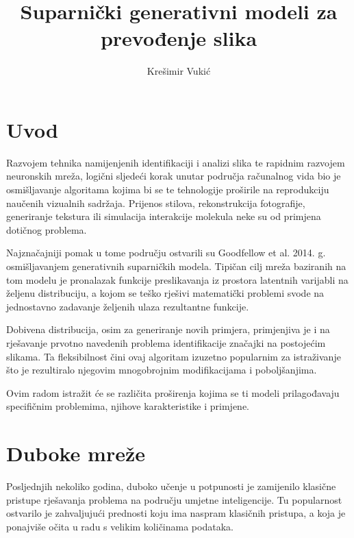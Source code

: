 \documentclass[lmodern, utf8, seminar]{fer}
\begin{document}
\nocite{*}



\title{Suparnički generativni modeli za prevođenje slika}

\author{Krešimir Vukić}

\maketitle


\tableofcontents




\chapter{Uvod}
Razvojem tehnika namijenjenih identifikaciji i analizi slika te rapidnim razvojem neuronskih mreža, logični sljedeći korak unutar područja računalnog vida bio je osmišljavanje algoritama kojima bi se te tehnologije proširile na reprodukciju naučenih vizualnih sadržaja. 
Prijenos stilova, rekonstrukcija fotografije, generiranje tekstura ili simulacija interakcije molekula neke su od primjena dotičnog problema.
\newline

Najznačajniji pomak u tome području ostvarili su Goodfellow et al. 2014. g. \cite{goodfellow2014generative} osmišljavanjem generativnih suparničkih modela. Tipičan cilj mreža baziranih na tom modelu je pronalazak funkcije preslikavanja iz prostora latentnih varijabli na željenu distribuciju, a kojom se teško rješivi matematički problemi svode na jednostavno zadavanje željenih ulaza rezultantne funkcije.
\newline

Dobivena distribucija, osim za generiranje novih primjera, primjenjiva je i na rješavanje prvotno navedenih problema identifikacije značajki na postojećim slikama. Ta fleksibilnost čini ovaj algoritam izuzetno popularnim za istraživanje što je rezultiralo njegovim mnogobrojnim modifikacijama i poboljšanjima.
\newline

Ovim radom istražit će se različita proširenja kojima se ti modeli prilagođavaju specifičnim problemima, njihove karakteristike i primjene.




\chapter{Duboke mreže}
Posljednjih nekoliko godina, duboko učenje u potpunosti je zamijenilo klasične pristupe rješavanja problema na području umjetne inteligencije. Tu popularnost ostvarilo je zahvaljujući prednosti koju ima naspram klasičnih pristupa, a koja je ponajviše očita u radu s velikim količinama podataka. 
\end{document}
